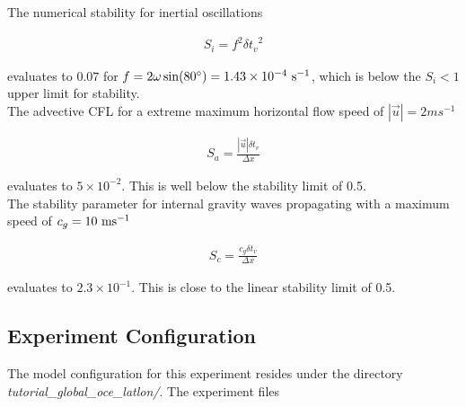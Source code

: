 \noindent The numerical stability for inertial oscillations
\citep{adcroft:95} 

\begin{eqnarray}
\label{eq:eg-global-inertial_stability}
S_{i} = f^{2} {\delta t_v}^2
\end{eqnarray}

\noindent evaluates to $0.07$ for
$f=2\omega\sin(80^{\circ})=1.43\times10^{-4}~{\rm s}^{-1}$, which is
below the $S_{i} < 1$ upper limit for stability.
\\

\noindent The advective CFL \citep{adcroft:95} for a extreme maximum 
horizontal flow
speed of $ | \vec{u} | = 2 ms^{-1}$

\begin{eqnarray}
\label{eq:eg-global-cfl_stability}
S_{a} = \frac{| \vec{u} | \delta t_{v}}{ \Delta x}
\end{eqnarray}

\noindent evaluates to $5 \times 10^{-2}$. This is well below the stability 
limit of 0.5.
\\

\noindent The stability parameter for internal gravity waves propagating
 with a maximum speed of $c_{g}=10~{\rm ms}^{-1}$
\citep{adcroft:95}

\begin{eqnarray}
\label{eq:eg-global-gfl_stability}
S_{c} = \frac{c_{g} \delta t_{v}}{ \Delta x}
\end{eqnarray}

\noindent evaluates to $2.3 \times 10^{-1}$. This is close to the linear
stability limit of 0.5.
  
\subsection{Experiment Configuration}
\label{sec:eg-global-clim_ocn_examp_exp_config}

The model configuration for this experiment resides under the
directory {\it tutorial\_global\_oce\_latlon/}. The experiment files

